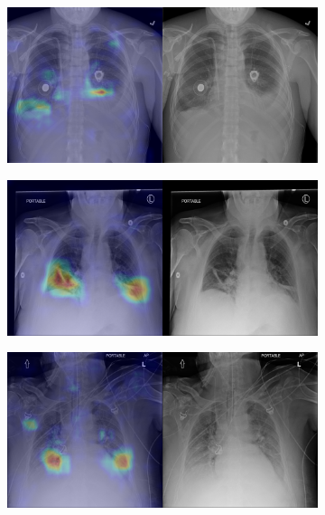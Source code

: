 \begin{figure}[b]
\begin{subfigure}{0.4\textwidth}
    \end{subfigure}
    \begin{subfigure}{0.4\textwidth}
        \centering
        \includegraphics[width=1.0\textwidth]{Chapters/5. Conclusiones/img/Atelectasis/1_1_00029596_022.png}
    \end{subfigure}
    \begin{subfigure}{0.4\textwidth}
        \centering
        \includegraphics[width=1.0\textwidth]{Chapters/5. Conclusiones/img/Atelectasis/1_1_00030408_000.png}
    \end{subfigure}
    \begin{subfigure}{0.4\textwidth}
        \centering
        \includegraphics[width=1.0\textwidth]{Chapters/5. Conclusiones/img/Atelectasis/1_1_00030408_013.png}

\end{subfigure}
\end{figure}
